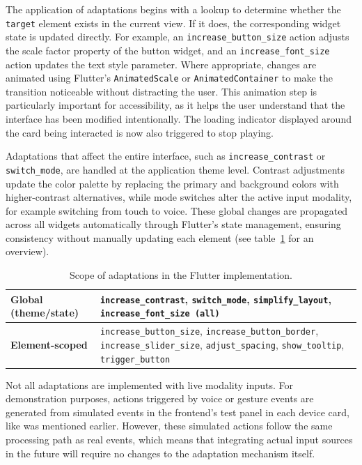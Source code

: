 \documentclass[openany]{book}
\begin{document}
The application of adaptations begins with a lookup to determine whether the \texttt{target} element exists in the current view. If it does, the corresponding widget state is updated directly. For example, an \texttt{increase\_button\_size} action adjusts the scale factor property of the button widget, and an \texttt{increase\_font\_size} action updates the text style parameter. Where appropriate, changes are animated using Flutter’s \texttt{AnimatedScale} or \texttt{AnimatedContainer} to make the transition noticeable without distracting the user. This animation step is particularly important for accessibility, as it helps the user understand that the interface has been modified intentionally. The loading indicator displayed around the card being interacted is now also triggered to stop playing.

Adaptations that affect the entire interface, such as \texttt{increase\_contrast} or \texttt{switch\_mode}, are handled at the application theme level. Contrast adjustments update the color palette by replacing the primary and background colors with higher-contrast alternatives, while mode switches alter the active input modality, for example switching from touch to voice. These global changes are propagated across all widgets automatically through Flutter’s state management, ensuring consistency without manually updating each element (see table~\ref{tab:adaptation-scope} for an overview).

\begin{table}[H]
\centering
\caption{Scope of adaptations in the Flutter implementation.}
\begin{tabular}{lp{9cm}}
\toprule
\textbf{Global (theme/state)} & \texttt{increase\_contrast}, \texttt{switch\_mode}, \texttt{simplify\_layout}, \texttt{increase\_font\_size (all)} \\
\midrule
\textbf{Element-scoped} & \texttt{increase\_button\_size}, \texttt{increase\_button\_border}, \texttt{increase\_slider\_size}, \texttt{adjust\_spacing}, \texttt{show\_tooltip}, \texttt{trigger\_button} \\
\bottomrule
\end{tabular}
\label{tab:adaptation-scope}
\end{table}

Not all adaptations are implemented with live modality inputs. For demonstration purposes, actions triggered by voice or gesture events are generated from simulated events in the frontend’s test panel in each device card, like was mentioned earlier. However, these simulated actions follow the same processing path as real events, which means that integrating actual input sources in the future will require no changes to the adaptation mechanism itself.
\end{document}
